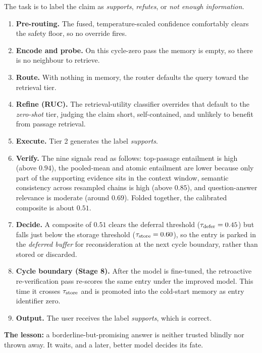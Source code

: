 \begin{scenario}
The task is to label the claim as \emph{supports}, \emph{refutes}, or \emph{not
enough information}.
\begin{enumerate}[leftmargin=1.5em, itemsep=2pt]
  \item \textbf{Pre-routing.} The fused, temperature-scaled confidence
  comfortably clears the safety floor, so no override fires.
  \item \textbf{Encode and probe.} On this cycle-zero pass the memory is empty,
  so there is no neighbour to retrieve.
  \item \textbf{Route.} With nothing in memory, the router defaults the query
  toward the retrieval tier.
  \item \textbf{Refine (RUC).} The retrieval-utility classifier overrides that
  default to the \emph{zero-shot} tier, judging the claim short, self-contained,
  and unlikely to benefit from passage retrieval.
  \item \textbf{Execute.} Tier 2 generates the label \emph{supports}.
  \item \textbf{Verify.} The nine signals read as follows: top-passage entailment
  is high (above $0.94$), the pooled-mean and atomic entailment are lower because
  only part of the supporting evidence sits in the context window, semantic
  consistency across resampled chains is high (above $0.85$), and
  question-answer relevance is moderate (around $0.69$). Folded together, the
  calibrated composite is about $0.51$.
  \item \textbf{Decide.} A composite of $0.51$ clears the deferral threshold
  ($\tau_{\text{defer}} = 0.45$) but falls just below the storage threshold
  ($\tau_{\text{store}} = 0.60$), so the entry is parked in the \emph{deferred buffer} for
  reconsideration at the next cycle boundary, rather than stored or discarded.
  \item \textbf{Cycle boundary (Stage 8).} After the model is fine-tuned, the
  retroactive re-verification pass re-scores the same entry under the improved
  model. This time it crosses $\tau_{\text{store}}$ and is promoted into the cold-start
  memory as entry identifier zero.
  \item \textbf{Output.} The user receives the label \emph{supports}, which is
  correct.
\end{enumerate}
\textbf{The lesson:} a borderline-but-promising answer is neither trusted blindly
nor thrown away. It waits, and a later, better model decides its fate.
\end{scenario}

